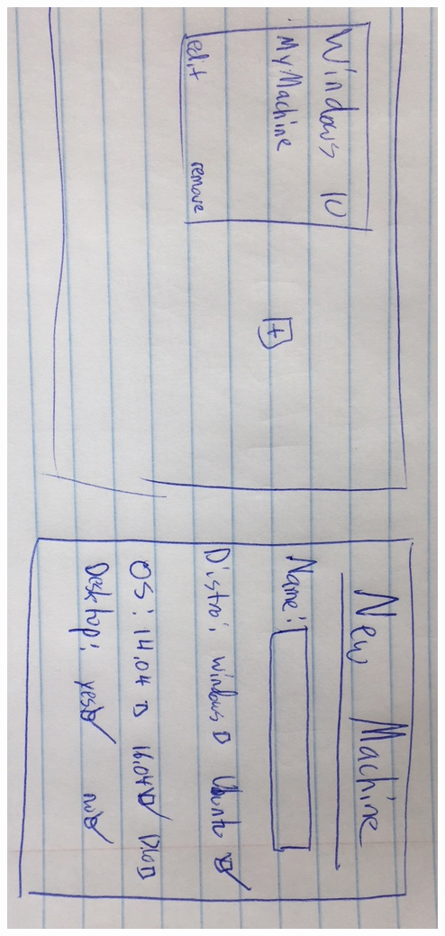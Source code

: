 \documentclass[openright]{report}
\begin{document}
\begin{center}
    \includegraphics[scale=0.27, angle=90]{images/design2.JPG}
    \label{design1}
\end{center}
\end{document}
